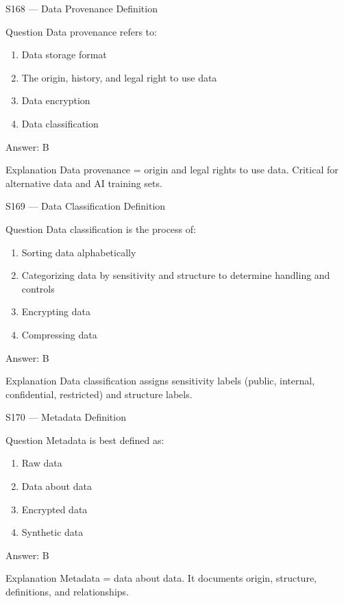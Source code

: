 \documentclass[aspectratio=169,8pt]{beamer}
\begin{document}
	\begin{frame}{S168 --- Data Provenance Definition}
		\begin{block}{Question}
			Data provenance refers to:
			\begin{enumerate}
				\item Data storage format
				\item The origin, history, and legal right to use data
				\item Data encryption
				\item Data classification
			\end{enumerate}
		\end{block}
		\begin{exampleblock}{Answer: B}\end{exampleblock}
		\begin{block}{Explanation}
			Data provenance = origin and legal rights to use data. Critical for alternative data and AI training sets.
		\end{block}
	\end{frame}
	
	\begin{frame}{S169 --- Data Classification Definition}
		\begin{block}{Question}
			Data classification is the process of:
			\begin{enumerate}
				\item Sorting data alphabetically
				\item Categorizing data by sensitivity and structure to determine handling and controls
				\item Encrypting data
				\item Compressing data
			\end{enumerate}
		\end{block}
		\begin{exampleblock}{Answer: B}\end{exampleblock}
		\begin{block}{Explanation}
			Data classification assigns sensitivity labels (public, internal, confidential, restricted) and structure labels.
		\end{block}
	\end{frame}
	
	\begin{frame}{S170 --- Metadata Definition}
		\begin{block}{Question}
			Metadata is best defined as:
			\begin{enumerate}
				\item Raw data
				\item Data about data
				\item Encrypted data
				\item Synthetic data
			\end{enumerate}
		\end{block}
		\begin{exampleblock}{Answer: B}\end{exampleblock}
		\begin{block}{Explanation}
			Metadata = data about data. It documents origin, structure, definitions, and relationships.
		\end{block}
	\end{frame}
	
\end{document}
